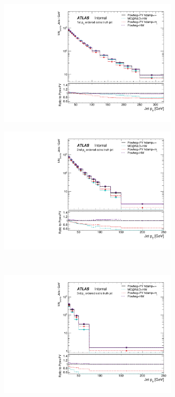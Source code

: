 \begin{figure}
\centering
\begin{subfigure}[]{0.33\textwidth}
\includegraphics[width=\textwidth]{fig/MCComp/TruthPtJet0.pdf}
\end{subfigure}
\begin{subfigure}[]{0.33\textwidth}
\includegraphics[width=\textwidth]{fig/MCComp/TruthPtJet1.pdf}
\end{subfigure}
\\
\begin{subfigure}[]{0.33\textwidth}
\includegraphics[width=\textwidth]{fig/MCComp/TruthPtJet2.pdf}

\end{subfigure}
\end{figure}
